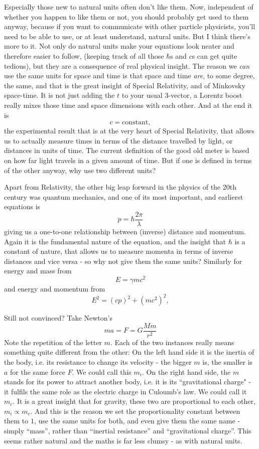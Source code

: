 Especially those new to natural units often don't like them. Now, independent of
whether you happen to like them or not, you should probably get used to them
anyway, because if you want to communicate with other particle physicists,
you'll need to be able to use, or at least understand, natural units.  But I
think there's more to it.  Not only do natural units make your equations look
neater and therefore easier to follow, (keeping track of all those $\hbar$s
and $c$s can get quite tedious), but they are a consequence of real physical
insight. The reason we \emph{can} use the same units for space and time is
that space and time \emph{are}, to some degree, the same, and that is the
great insight of Special Relativity, and of Minkovsky space-time. It is not
just adding the $t$ to your usual 3-vector, a Lorentz boost really mixes those
time and space dimensions with each other.  And at the end it is
\[
c=\mathrm{constant},
\]
the experimental result that is at the very heart of Special Relativity, that
allows us to actually measure times in terms of the distance travelled by
light, or distances in units of time. The current definition of the good old
meter is based on how far light travels in a given amount of time. But if one
is defined in terms of the other anyway, why use two different units?

Apart from Relativity, the other big leap forward in the physics of the 20th
century was quantum mechanics, and one of its most important, and earlierst
equations is
\[
   p = \hbar \frac{2\pi}{\lambda}
\]
giving us a one-to-one relationship  between (inverse) distance and
momentum. Again it is the fundamental nature of the equation, and the
insight that $\hbar$ is a constant of nature, that allows us to measure
momenta in terms of inverse distances and vice versa - so why not give them
the same units? Similarly for energy and mass from
\[
 E = \gamma m c^2
\]
and energy and momentum from
\[
  E^2 = (cp)^2 + (mc^2)^2,
\]

Still not convinced? Take Newton's
\[
   ma = F = G \frac{Mm}{r^2}
\]
Note the repetition of the letter $m$. Each of the two instances
really means something quite different from the other: On the left
hand side it is the inertia of the body, i.e. its resistance to change
its velocity - the bigger $m$ is, the smaller is $a$ for the same
force $F$. We could call this $m_i$. On the right hand side, the $m$
stands for its power to attract another body, i.e. it is its
``gravitational charge" - it fulfils the same role as the electric
charge in Culoumb's law. We could call it $m_c$. It is
a great insight that for gravity, these two are proportional to each
other, $m_i \propto m_c$. And this is the reason we set the
proportionality constant between them to $1$, use the same units for
both, and even give them the same name - simply ``mass'', rather than
``inertial resistance'' and ``gravitational charge''. This seems
rather natural and the maths is far less clumsy - as with natural
units.
